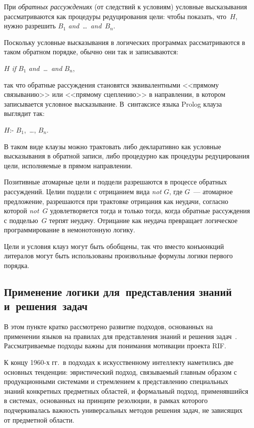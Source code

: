 \begin{multicols}{2}
При \textit{обратных рассуждениях} (от следствий к условиям) условные высказывания 
рассматриваются как процедуры редуцирования цели: чтобы показать, что~$H$, нужно 
разрешить $B_1$ \textit{and}\ \ldots\ \textit{and}~$B_n$.

Поскольку условные высказывания в логических программах рассматриваются в таком 
обратном порядке, обычно они так и записываются:

$H$ \textit{ if} $B_1$ \textit{and\ \ldots\ and} $B_n$,

\noindent
так что обратные рассуждения становятся эквивалентными <<прямому связыванию>> или 
<<прямому сцеплению>> в направлении, в котором записывается условное высказывание. 
В~синтаксисе языка Prolog клауза выглядит так:

$H$:\;- $B_1$,\ \ldots , $B_n$.

\noindent
В таком виде клаузы можно трактовать либо декларативно как условные высказывания в 
обратной записи, либо процедурно как процедуры редуцирования цели, исполняемые в 
прямом направлении. 

Позитивные атомарные цели и подцели разрешаются в процессе обратных рассуждений. 
Цели\linebreak и подцели с отрицанием вида \textit{not} $G$, где $G$~--- атомарное предложение, 
разрешаются при трактовке отрицания как неудачи, согласно которой \textit{not}~$G$ 
удовле\-тво\-ря\-ет\-ся тогда и только тогда, когда обратные рассуждения с подцелью~$G$ терпят 
неудачу. Отрицание как неудача превращает логическое программирование в 
немонотонную логику.

Цели и условия клауз могут быть обобщены, так что вместо конъюнкций литералов могут 
быть использованы произвольные формулы логики первого порядка.
   
   \subsection{Применение логики для~представления знаний и~решения~задач} %

В этом пункте кратко рассмотрено развитие подходов, основанных на применении языков 
на правилах для представления знаний и решения задач~\cite{10kal}. Рассматриваемые 
подходы важны для понимания мотивации проекта RIF.

К концу 1960-х гг.\ в подходах к искусственному интеллекту наметились две 
основных тенденции: эвристический подход, связываемый главным образом с 
продукционными системами и стремлением к представлению специальных знаний 
конкретных предметных областей, и формальный подход, применявшийся в системах, 
основанных на принципе резолюции, в рамках которого подчеркивалась важность 
универсальных методов решения задач, не зависящих от предметной области.


\end{multicols}
